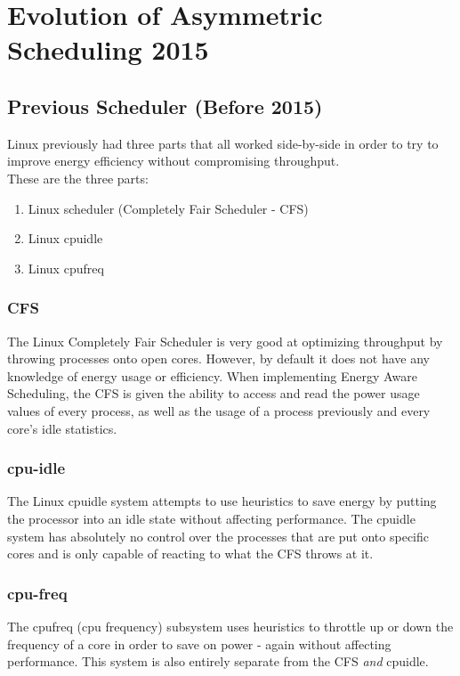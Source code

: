 \section{Evolution of Asymmetric Scheduling 2015}
\subsection{Previous Scheduler (Before 2015)}
Linux previously had three parts that all worked side-by-side in order to try to improve energy efficiency without compromising throughput.\\
These are the three parts:
\begin{enumerate} 
    \item Linux scheduler (Completely Fair Scheduler - CFS)
    \item Linux cpuidle
    \item Linux cpufreq
\end{enumerate}

\subsubsection{CFS}
The Linux Completely Fair Scheduler is very good at optimizing throughput by throwing processes onto open cores. However, by default it does not have any knowledge of energy usage or efficiency. When implementing Energy Aware Scheduling, the CFS is given the ability to access and read the power usage values of every process, as well as the usage of a process previously and every core's idle statistics.\cite{EAS2015}

\subsubsection{cpu-idle}
The Linux cpuidle system attempts to use heuristics to save energy by putting the processor into an idle state without affecting performance. The cpuidle system has absolutely no control over the processes that are put onto specific cores and is only capable of reacting to what the CFS throws at it.\cite{EAS2015}

\subsubsection{cpu-freq}
The cpufreq (cpu frequency) subsystem uses heuristics to throttle up or down the frequency of a core in order to save on power - again without affecting performance. This system is also entirely separate from the CFS \textit{and} cpuidle. \cite{EAS2015}

